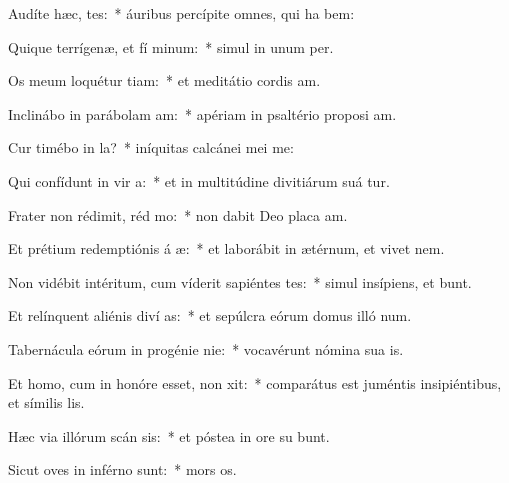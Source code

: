 \item Audíte hæc,  tes:~* áuribus percípite omnes, qui ha bem:
\item Quique terrígenæ, et fí minum:~* simul in unum   per.
\item Os meum loquétur tiam:~* et meditátio cordis  am.
\item Inclinábo in parábolam  am:~* apériam in psaltério proposi am.
\item Cur timébo in  la?~* iníquitas calcánei mei  me:
\item Qui confídunt in vir a:~* et in multitúdine divitiárum suá tur.
\item Frater non rédimit, réd mo:~* non dabit Deo placa am.
\item Et prétium redemptiónis á æ:~* et laborábit in ætérnum, et vivet   nem.
\item Non vidébit intéritum, cum víderit sapiéntes tes:~* simul insípiens, et  bunt.
\item Et relínquent aliénis diví as:~* et sepúlcra eórum domus illó  num.
\item Tabernácula eórum in progénie  nie:~* vocavérunt nómina sua   is.
\item Et homo, cum in honóre esset, non xit:~* comparátus est juméntis insipiéntibus, et símilis   lis.
\item Hæc via illórum scán sis:~* et póstea in ore su bunt.
\item Sicut oves in inférno  sunt:~* mors  os.
